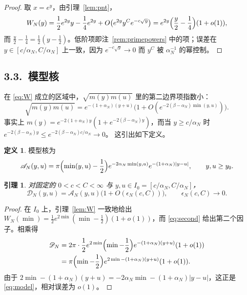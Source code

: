 \documentclass[12pt,a4paper]{amsart}
\numberwithin{equation}{section}
\theoremstyle{plain}
\newtheorem{lemma}[theorem]{引理}
\theoremstyle{definition}
\newtheorem{definition}[theorem]{定义}
\begin{document}
\begin{proof}
取 $x=e^y$，由引理~\ref{lem:pnt}，
\[
 W_N(y)=\frac12e^{2y}y-\frac14e^{2y}+O\bigl(e^{2y}y^Ce^{-c\sqrt{y}}\bigr)
 =e^{2y}\Bigl(\frac y2-\frac14\Bigr)(1+o(1)),
\]
而 $\frac y2-\frac14=\frac12(y-\frac12)$。低阶项即注~\ref{rem:primepowers}
中的项；误差在 $y\in[c/\alpha_N,C/\alpha_N]$ 上一致，因为
$e^{-c\sqrt{y}}\to0$ 而 $y^C$ 被 $\alpha_N^{-1}$ 的幂控制。
\end{proof}

\subsection*{3.3.\ 模型核}

在 \eqref{eq:W} 成立的区域中，$\sqrt{m(y)m(u)}$ 里的第二边界项指数小：
\begin{equation}\label{eq:second}
 \sqrt{m(y)m(u)}
 =e^{-(1+\alpha_N)(y+u)}
 \bigl(1+O(e^{-2(\beta-\alpha_N)\min(y,u)})\bigr).
\end{equation}
事实上 $m(y)=e^{-2(1+\alpha_N)y}(1+e^{-2(\beta-\alpha_N)y})$，而当
$y\ge c/\alpha_N$ 时 $e^{-2(\beta-\alpha_N)y}\le e^{-2(\beta-\alpha_N)c/\alpha_N}\to0$。
这引出如下定义。

\begin{definition}\label{def:model}
模型核为
\begin{equation}\label{eq:model}
 \mathscr A_N(y,u)=\pi\Bigl(\min(y,u)-\frac12\Bigr)
 e^{-2\alpha_N\min(y,u)}e^{-(1+\alpha_N)|y-u|},
 \qquad y,u\ge y_0 .
\end{equation}
\end{definition}

\begin{lemma}\label{lem:close}
对固定的 $0<c<C<\infty$ 与 $y,u\in I_0=[c/\alpha_N,C/\alpha_N]$，
\begin{equation}\label{eq:close}
 \mathscr D_N(y,u)=\mathscr A_N(y,u)\bigl(1+O(\epsilon_N(c,C))\bigr),
 \qquad \epsilon_N(c,C)\longrightarrow0 .
\end{equation}
\end{lemma}

\begin{proof}
在 $I_0$ 上，引理~\ref{lem:W} 一致地给出
$W_N(\min)=\frac12e^{2\min}(\min-\frac12)(1+o(1))$，而 \eqref{eq:second}
给出第二个因子。相乘得
\[
 \begin{aligned}
 \mathscr D_N
 &=2\pi\cdot\frac12 e^{2\min}\Bigl(\min-\frac12\Bigr)e^{-(1+\alpha_N)(y+u)}(1+o(1))\\
 &=\pi\Bigl(\min-\frac12\Bigr)e^{2\min-(1+\alpha_N)(y+u)}(1+o(1)).
 \end{aligned}
\]
由于 $2\min-(1+\alpha_N)(y+u)=-2\alpha_N\min-(1+\alpha_N)|y-u|$，这正是
\eqref{eq:model}，相对误差为 $o(1)$。
\end{proof}
\end{document}

